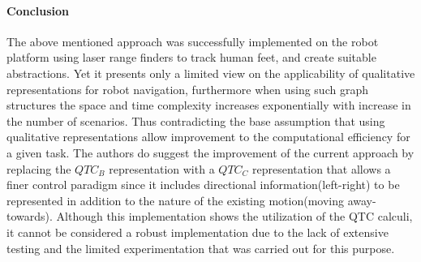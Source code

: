 \begin{itemize}
	\paragraph{Conclusion} The above mentioned approach was successfully implemented on the robot platform using laser range finders to track human feet, and create suitable abstractions. Yet it presents only a limited view on the applicability of qualitative representations for robot navigation, furthermore when using such graph structures the space and time complexity increases exponentially with increase in the number of scenarios. Thus contradicting the base assumption that using qualitative representations allow improvement to the computational efficiency for a given task. The authors do suggest the improvement of the current approach by replacing the $QTC_B$ representation with a $QTC_C$ representation that allows a finer control paradigm since it includes directional information(left-right) to be represented in addition to the nature of the existing motion(moving away-towards). Although this implementation shows the utilization of the QTC calculi, it cannot be considered a robust implementation due to the lack of extensive testing and the limited experimentation that was carried out for this purpose.
	

\end{itemize}
